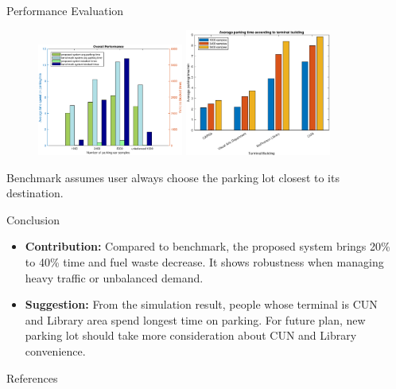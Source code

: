 \documentclass[final, xcolor={table,dvipsnames},t]{beamer}
\newlength{\sepwidth}
\newlength{\colwidth}
\newcommand{\separatorcolumn}{\begin{column}{\sepwidth}\end{column}}
\begin{document}
\begin{frame}[t]
\begin{columns}[t]
\begin{column}{\colwidth}
\begin{block}{Performance Evaluation}
\begin{figure}[h]
    \centering
    \includegraphics[width=0.45\textwidth]{overall.eps} 
    \hfill 
    \includegraphics[width=0.45\textwidth]{parkinglot.eps} 
    \label{performance} 
\end{figure}
Benchmark assumes user always choose the parking lot closest to its destination.


  \end{block}

  \begin{block}{Conclusion}
    \begin{itemize}
      \item \textbf{Contribution:} Compared to benchmark, the proposed system brings 20\% to 40\% time and fuel waste decrease. It shows robustness when managing heavy traffic or unbalanced demand.
      \item \textbf{Suggestion:}  From the simulation result, people whose terminal is CUN and Library area spend longest time on parking. For future plan, new parking lot should take more consideration about CUN and Library convenience. 
    \end{itemize}
      
  \end{block}

  \begin{block}{References}

    \nocite{*}
    \scriptsize{}

  \end{block}

\end{column}

\separatorcolumn
\end{columns}
\end{frame}
\end{document}
